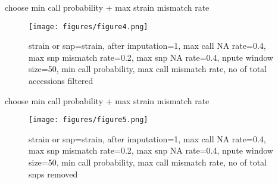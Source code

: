 \documentclass{beamer}
\begin{document}
\begin{frame}{choose min call probability + max strain mismatch rate}
\begin{figure}
\texttt{[image: figures/figure4.png]}
\caption{strain or snp=strain, after imputation=1, max call NA rate=0.4, max snp mismatch rate=0.2, max snp NA rate=0.4, npute window size=50, min call probability, max call mismatch rate, no of total accessions filtered}\label{f4}
\end{figure}
\end{frame}

\begin{frame}{choose min call probability + max strain mismatch rate}
\begin{figure}
\texttt{[image: figures/figure5.png]}
\caption{strain or snp=strain, after imputation=1, max call NA rate=0.4, max snp mismatch rate=0.2, max snp NA rate=0.4, npute window size=50, min call probability, max call mismatch rate, no of total snps removed}\label{f5}
\end{figure}
\end{frame}
\end{document}

